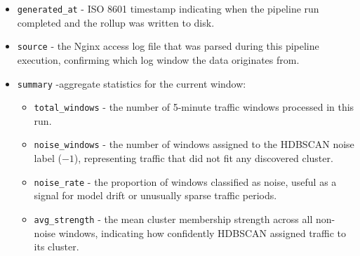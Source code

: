\documentclass[12pt, a4paper]{report}   %
\begin{document}
\begin{itemize}
    \item \texttt{generated\_at} - ISO 8601 timestamp indicating when the 
    pipeline run completed and the rollup was written to disk.
    
    \item \texttt{source} - the Nginx access log file that was parsed during 
    this pipeline execution, confirming which log window the data originates from.
    
    \item \texttt{summary} -aggregate statistics for the current window:
    \begin{itemize}
        \item \texttt{total\_windows} - the number of 5-minute traffic windows 
        processed in this run.
        \item \texttt{noise\_windows} - the number of windows assigned to the 
        HDBSCAN noise label ($-1$), representing traffic that did not fit any 
        discovered cluster.
        \item \texttt{noise\_rate} - the proportion of windows classified as 
        noise, useful as a signal for model drift or unusually sparse traffic 
        periods.
        \item \texttt{avg\_strength} - the mean cluster membership strength 
        across all non-noise windows, indicating how confidently HDBSCAN assigned 
        traffic to its cluster.
    \end{itemize}
    

\end{itemize}
\end{document}
